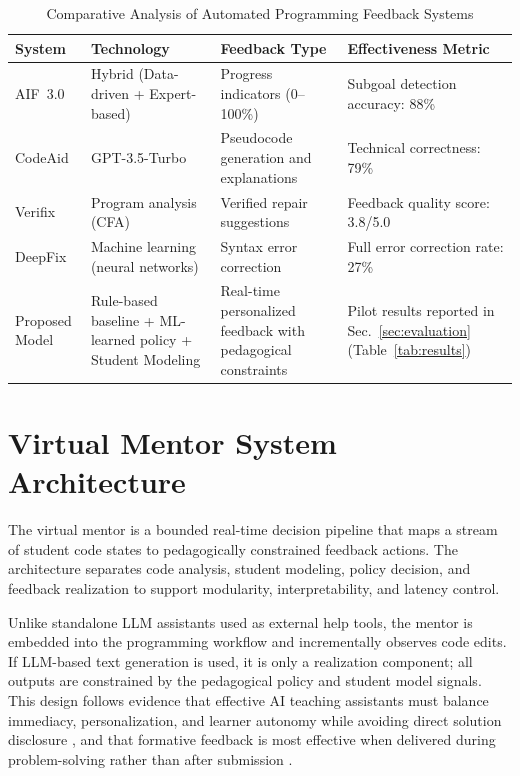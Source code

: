 \documentclass[conference]{IEEEtran}
\begin{document}
\begin{table}[t]
\centering
\caption{Comparative Analysis of Automated Programming Feedback Systems}
\label{tab:feedback_comparison}
\renewcommand{\arraystretch}{1.2}
\begin{tabular}{p{2.6cm} p{3.6cm} p{4.6cm} p{3.8cm}}
\hline
\textbf{System} &
\textbf{Technology} &
\textbf{Feedback Type} &
\textbf{Effectiveness Metric} \\
\hline

AIF~3.0 \cite{AdaptiveImmediateFeedbackforBlockBasedProgramming} &
Hybrid (Data-driven + Expert-based) &
Progress indicators (0--100\%) &
Subgoal detection accuracy: 88\% \\

CodeAid \cite{CodeAid} &
GPT-3.5-Turbo &
Pseudocode generation and explanations &
Technical correctness: 79\% \\

Verifix \cite{NavigatingAutomatedFeedback} &
Program analysis (CFA) &
Verified repair suggestions &
Feedback quality score: 3.8/5.0 \\

DeepFix \cite{NavigatingAutomatedFeedback} &
Machine learning (neural networks) &
Syntax error correction &
Full error correction rate: 27\% \\

Proposed Model &
Rule-based baseline + ML-learned policy + Student Modeling &
Real-time personalized feedback with pedagogical constraints &
Pilot results reported in Sec.~\ref{sec:evaluation} (Table~\ref{tab:results}) \\



\hline
\end{tabular}
\end{table}

\section{Virtual Mentor System Architecture}
The virtual mentor is a bounded real-time decision pipeline that maps a stream of student code states to pedagogically constrained feedback actions. The architecture separates code analysis, student modeling, policy decision, and feedback realization to support modularity, interpretability, and latency control.

Unlike standalone LLM assistants used as external help tools, the mentor is embedded into the programming workflow and incrementally observes code edits. If LLM-based text generation is used, it is only a realization component; all outputs are constrained by the pedagogical policy and student model signals. This design follows evidence that effective AI teaching assistants must balance immediacy, personalization, and learner autonomy while avoiding direct solution disclosure \cite{DesirableCharacteristicsforAITeachingAssistantsinProgrammingEducation,CodeAid}, and that formative feedback is most effective when delivered during problem-solving rather than after submission \cite{SystematicLiteratureReviewonLLM}.
\end{document}
